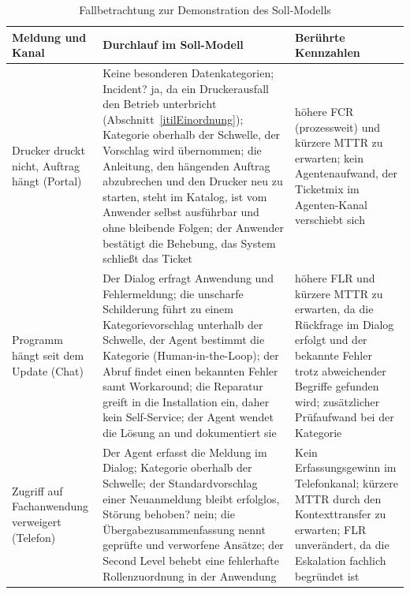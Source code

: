 \begin{table}[!htb]
	\centering
	\caption{Fallbetrachtung zur Demonstration des Soll-Modells}
	\label{tab:demonstration}
	\small
	\begin{tabularx}{\textwidth}{@{}>{\raggedright\arraybackslash}p{2.6cm}>{\raggedright\arraybackslash}X>{\raggedright\arraybackslash}p{3.6cm}@{}}
		\toprule
		Meldung und Kanal & Durchlauf im Soll-Modell & Ber\"uhrte Kennzahlen \\
		\midrule
		\glqq Drucker druckt nicht, Auftrag h\"angt\grqq{} (Portal) & Keine besonderen Datenkategorien; \glqq Incident?\grqq{} ja, da ein Druckerausfall den Betrieb unterbricht (Abschnitt~\ref{itilEinordnung}); Kategorie oberhalb der Schwelle, der Vorschlag wird \"ubernommen; die Anleitung, den h\"angenden Auftrag abzubrechen und den Drucker neu zu starten, steht im Katalog, ist vom Anwender selbst ausf\"uhrbar und ohne bleibende Folgen; der Anwender best\"atigt die Behebung, das System schlie{\ss}t das Ticket & h\"ohere FCR (prozessweit) und k\"urzere MTTR zu erwarten; kein Agentenaufwand, der Ticketmix im Agenten-Kanal verschiebt sich \\
		\addlinespace
		\glqq Programm h\"angt seit dem Update\grqq{} (Chat) & Der Dialog erfragt Anwendung und Fehlermeldung; die unscharfe Schilderung f\"uhrt zu einem Kategorievorschlag unterhalb der Schwelle, der Agent bestimmt die Kategorie (Human-in-the-Loop); der Abruf findet einen bekannten Fehler samt Workaround; die Reparatur greift in die Installation ein, daher kein Self-Service; der Agent wendet die L\"osung an und dokumentiert sie & h\"ohere FLR und k\"urzere MTTR zu erwarten, da die R\"uckfrage im Dialog erfolgt und der bekannte Fehler trotz abweichender Begriffe gefunden wird; zus\"atzlicher Pr\"ufaufwand bei der Kategorie \\
		\addlinespace
		\glqq Zugriff auf Fachanwendung verweigert\grqq{} (Telefon) & Der Agent erfasst die Meldung im Dialog; Kategorie oberhalb der Schwelle; der Standardvorschlag einer Neuanmeldung bleibt erfolglos, \glqq St\"orung behoben?\grqq{} nein; die \"Ubergabezusammenfassung nennt gepr\"ufte und verworfene Ans\"atze; der Second Level behebt eine fehlerhafte Rollenzuordnung in der Anwendung & Kein Erfassungsgewinn im Telefonkanal; k\"urzere MTTR durch den Kontexttransfer zu erwarten; FLR unver\"andert, da die Eskalation fachlich begr\"undet ist \\
		\bottomrule
	\end{tabularx}
\end{table}

